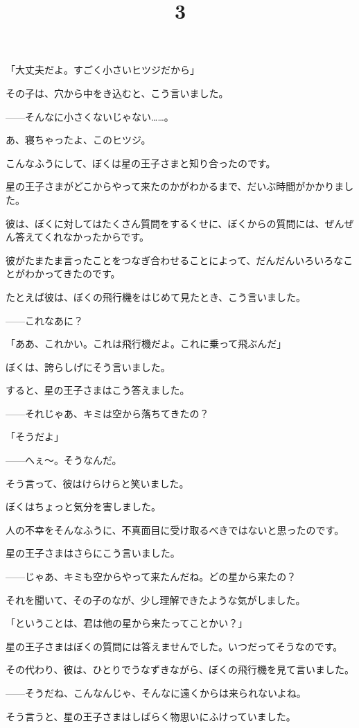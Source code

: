 「大丈夫だよ。すごく小さいヒツジだから」

その子は、穴から中をき込むと、こう言いました。

——そんなに小さくないじゃない……。

あ、寝ちゃったよ、このヒツジ。

こんなふうにして、ぼくは星の王子さまと知り合ったのです。

\title{3}

星の王子さまがどこからやって来たのかがわかるまで、だいぶ時間がかかりました。

彼は、ぼくに対してはたくさん質問をするくせに、ぼくからの質問には、ぜんぜん答えてくれなかったからです。

彼がたまたま言ったことをつなぎ合わせることによって、だんだんいろいろなことがわかってきたのです。

たとえば彼は、ぼくの飛行機をはじめて見たとき、こう言いました。

——これなあに？

「ああ、これかい。これは飛行機だよ。これに乗って飛ぶんだ」

ぼくは、誇らしげにそう言いました。

すると、星の王子さまはこう答えました。

——それじゃあ、キミは空から落ちてきたの？

「そうだよ」


——へぇ～。そうなんだ。

そう言って、彼はけらけらと笑いました。

ぼくはちょっと気分を害しました。

人の不幸をそんなふうに、不真面目に受け取るべきではないと思ったのです。

星の王子さまはさらにこう言いました。

——じゃあ、キミも空からやって来たんだね。どの星から来たの？

それを聞いて、その子のなが、少し理解できたような気がしました。

「ということは、君は他の星から来たってことかい？」

星の王子さまはぼくの質問には答えませんでした。いつだってそうなのです。

その代わり、彼は、ひとりでうなずきながら、ぼくの飛行機を見て言いました。

——そうだね、こんなんじゃ、そんなに遠くからは来られないよね。

そう言うと、星の王子さまはしばらく物思いにふけっていました。

